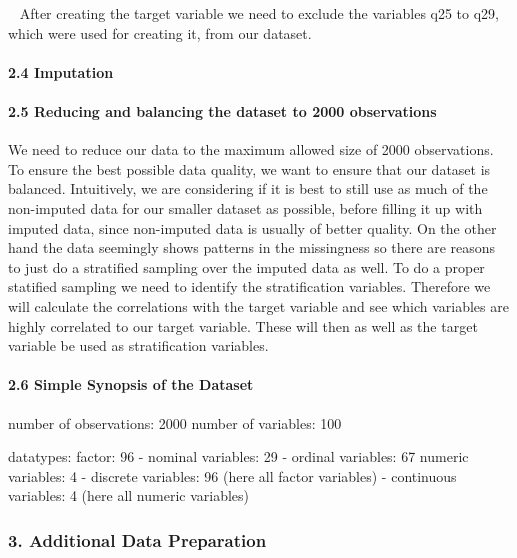 \documentclass[
]{article}
\begin{document}
~ After creating the target variable we need to exclude the variables
q25 to q29, which were used for creating it, from our dataset.

\hypertarget{imputation}{%
\paragraph{2.4 Imputation}\label{imputation}}

\hypertarget{reducing-and-balancing-the-dataset-to-2000-observations}{%
\paragraph{2.5 Reducing and balancing the dataset to 2000
observations}\label{reducing-and-balancing-the-dataset-to-2000-observations}}

\hfill\break
We need to reduce our data to the maximum allowed size of 2000
observations. To ensure the best possible data quality, we want to
ensure that our dataset is balanced. Intuitively, we are considering if
it is best to still use as much of the non-imputed data for our smaller
dataset as possible, before filling it up with imputed data, since
non-imputed data is usually of better quality. On the other hand the
data seemingly shows patterns in the missingness so there are reasons to
just do a stratified sampling over the imputed data as well. To do a
proper statified sampling we need to identify the stratification
variables. Therefore we will calculate the correlations with the target
variable and see which variables are highly correlated to our target
variable. These will then as well as the target variable be used as
stratification variables.

\hypertarget{simple-synopsis-of-the-dataset}{%
\paragraph{2.6 Simple Synopsis of the
Dataset}\label{simple-synopsis-of-the-dataset}}

\hfill\break
number of observations: 2000 number of variables: 100

datatypes: factor: 96 - nominal variables: 29 - ordinal variables: 67
numeric variables: 4 - discrete variables: 96 (here all factor
variables) - continuous variables: 4 (here all numeric variables)

\hypertarget{additional-data-preparation}{%
\subsubsection{3. Additional Data
Preparation}\label{additional-data-preparation}}
\end{document}
